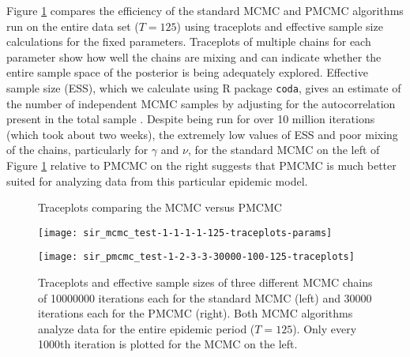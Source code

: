 Figure \ref{fig:epid:mcmc} compares the efficiency of the standard MCMC and PMCMC algorithms run on the entire data set ($T = 125$) using traceplots and effective sample size calculations for the fixed parameters. Traceplots of multiple chains for each parameter show how well the chains are mixing and can indicate whether the entire sample space of the posterior is being adequately explored. Effective sample size (ESS), which we calculate using R package {\tt coda}, gives an estimate of the number of independent MCMC samples by adjusting for the autocorrelation present in the total sample \citep{coda}. Despite being run for over 10 million iterations (which took about two weeks), the extremely low values of ESS and poor mixing of the chains, particularly for $\gamma$ and $\nu$, for the standard MCMC on the left of Figure \ref{fig:epid:mcmc} relative to PMCMC on the right suggests that PMCMC is much better suited for analyzing data from this particular epidemic model.

\begin{figure}
\ssp
\centering
\caption{Traceplots comparing the MCMC versus PMCMC} \label{fig:epid:mcmc}
\begin{minipage}{0.45\linewidth}
\texttt{[image: sir\_mcmc\_test-1-1-1-1-125-traceplots-params]}
\end{minipage}
\begin{minipage}{0.45\linewidth}
\texttt{[image: sir\_pmcmc\_test-1-2-3-3-30000-100-125-traceplots]}
\end{minipage}
\caption*{Traceplots and effective sample sizes of three different MCMC chains of 10000000 iterations each for the standard MCMC (left) and 30000 iterations each for the PMCMC (right). Both MCMC algorithms analyze data for the entire epidemic period ($T = 125$). Only every 1000th iteration is plotted for the MCMC on the left.}
\end{figure}

